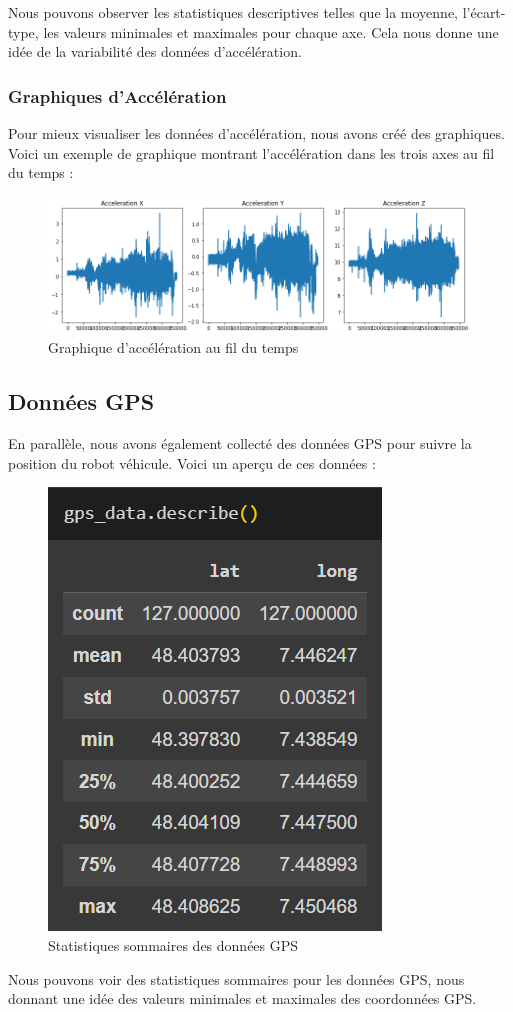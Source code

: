 Nous pouvons observer les statistiques descriptives telles que la moyenne, l'écart-type, les valeurs minimales et maximales pour chaque axe. Cela nous donne une idée de la variabilité des données d'accélération.

\subsubsection{Graphiques d'Accélération}
Pour mieux visualiser les données d'accélération, nous avons créé des graphiques. Voici un exemple de graphique montrant l'accélération dans les trois axes au fil du temps :

\begin{figure}[h]
    \centering
    \includegraphics[width=0.8\linewidth]{img/accdata_evol.png}
    \caption{Graphique d'accélération au fil du temps}
    \label{acceleration_graph}
\end{figure}

\subsection{Données GPS}
En parallèle, nous avons également collecté des données GPS pour suivre la position du robot véhicule. Voici un aperçu de ces données :

\begin{figure}[h]
    \centering
    \includegraphics[width=0.3\linewidth]{img/gpsdata.png}
    \caption{Statistiques sommaires des données GPS}
    \label{gps_stats}
\end{figure}

Nous pouvons voir des statistiques sommaires pour les données GPS, nous donnant une idée des valeurs minimales et maximales des coordonnées GPS.

